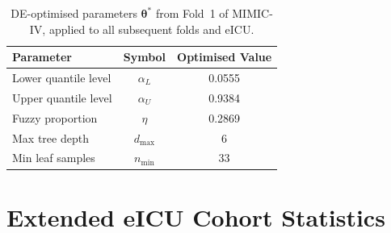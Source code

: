 \documentclass[a4paper,fleqn,longmktitle]{cas-sc}
\begin{document}
	\begin{table}[!h]
		\centering
		\caption{DE-optimised parameters $\boldsymbol{\theta}^*$ from Fold~1
			of MIMIC-IV, applied to all subsequent folds and eICU.}
		\label{tab:de_params}
		\small
		\begin{tabular}{lcc}
			\toprule
			\textbf{Parameter} & \textbf{Symbol} & \textbf{Optimised Value} \\
			\midrule
			Lower quantile level  & $\alpha_L$       & 0.0555 \\
			Upper quantile level  & $\alpha_U$       & 0.9384 \\
			Fuzzy proportion      & $\eta$           & 0.2869 \\
			Max tree depth        & $d_{\max}$       & 6 \\
			Min leaf samples      & $n_{\min}$       & 33 \\
			\bottomrule
		\end{tabular}
	\end{table}
	
	\section{Extended eICU Cohort Statistics}
	\label{app:eicu_stats}
	
\end{document}
